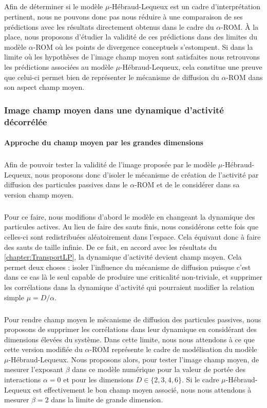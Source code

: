 \subparagraph{}Afin de déterminer si le modèle $\mu$-Hébraud-Lequeux est un cadre d'interprétation pertinent, nous ne pouvons donc pas nous réduire à une comparaison de ses prédictions avec les résultats directement obtenus dans le cadre du $\alpha$-ROM. \`A la place, nous proposons d'étudier la validité de ces prédictions dans des limites du modèle $\alpha$-ROM où les points de divergence conceptuels s'estompent. Si dans la limite où les hypothèses de l'image champ moyen sont satisfaites nous retrouvons les prédictions associées au modèle $\mu$-Hébraud-Lequeux, cela constitue une preuve que celui-ci permet bien de représenter le mécanisme de diffusion du $\alpha$-ROM dans son aspect champ moyen.

\subsubsection{Image champ moyen dans une dynamique d'activité décorrélée}

\paragraph{Approche du champ moyen par les grandes dimensions}

\subparagraph{}Afin de pouvoir tester la validité de l'image proposée par le modèle $\mu$-Hébraud-Lequeux, nous proposons donc d'isoler le mécanisme de création de l'activité par diffusion des particules passives dans le $\alpha$-ROM et de le considérer dans sa version champ moyen. 

\subparagraph{}Pour ce faire, nous modifions d'abord le modèle en changeant la dynamique des particules actives. Au lieu de faire des sauts finis, nous considérons cette fois que celles-ci sont redistribuées aléatoirement dans l'espace. Cela équivaut donc à faire des sauts de taille infinie. De ce fait, en accord avec les résultats du \autoref{chapter:TransportLP}, la dynamique d'activité devient champ moyen. Cela permet deux choses : isoler l'influence du mécanisme de diffusion puisque c'est dans ce cas là le seul capable de produire une criticalité non-triviale, et supprimer les corrélations dans la dynamique d'activité qui pourraient modifier la relation simple $\mu = D/\alpha$.

\subparagraph{}Pour rendre champ moyen le mécanisme de diffusion des particules passives, nous proposons de supprimer les corrélations dans leur dynamique en considérant des dimensions élevées du système. Dans cette limite, nous nous attendons à ce que cette version modifiée du $\alpha$-ROM représente le cadre de modélisation du modèle $\mu$-Hébraud-Lequeux. Nous proposons alors, pour tester l'image champ moyen, de mesurer l'exposant $\beta$ dans ce modèle numérique pour la valeur de portée des interactions $\alpha = 0$ et pour les dimensions $D\in\{2,3,4,6\}$. Si le cadre $\mu$-Hébraud-Lequeux est effectivement le bon champ moyen associé, nous nous attendons à mesurer $\beta = 2$ dans la limite de grande dimension.

